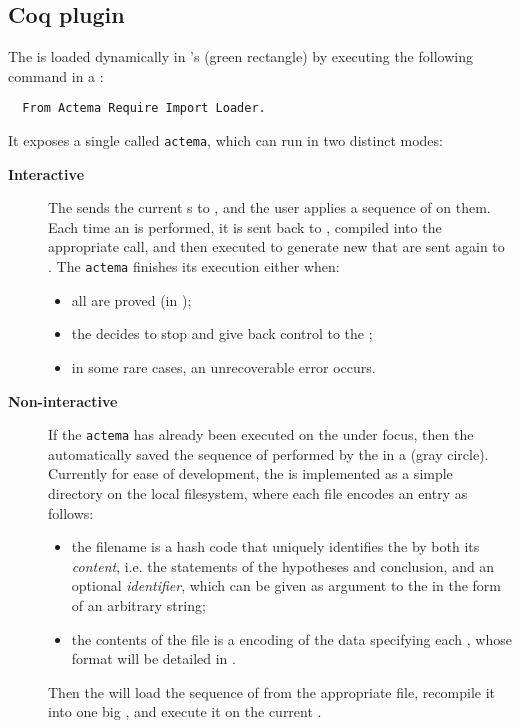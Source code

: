 \subsection{Coq plugin}

The  is loaded dynamically in 's  (green
rectangle) by executing the following command in a :
\begin{verbatim}
  From Actema Require Import Loader.
\end{verbatim}
It exposes a single  called \texttt{actema}, which can run in two
distinct modes:
\begin{description}
  \item[\bfseries Interactive] The  sends the current
  s to , and the user applies a sequence of  on
  them. Each time an  is performed, it is sent back to , compiled
  into the appropriate  call, and then executed to generate new
   that are sent again to . The \texttt{actema}
   finishes its execution either when:
  \begin{itemize}
    \item all  are proved (in );
    \item the  decides to stop and give back control to the
    ;
    \item in some rare cases, an unrecoverable error occurs.
  \end{itemize}

  \item[\bfseries Non-interactive] If the \texttt{actema}  has
  already been executed on the  under focus, then the
   automatically saved the sequence of  performed by the
   in a  (gray circle). Currently for ease of
  development, the  is implemented as a simple directory on
  the local filesystem, where each file encodes an entry as follows:
  \begin{itemize}
    \item the filename is a hash code that uniquely identifies the  by both
    its \emph{content}, i.e. the statements of the hypotheses and conclusion,
    and an optional \emph{identifier}, which can be given as argument to the
     in the form of an arbitrary string;
    \item the contents of the file is a  encoding of
    the data specifying each , whose format will be detailed in
    .
  \end{itemize}
  Then the  will load the sequence of  from the appropriate file,
  recompile it into one big , and execute it on the current .
\end{description}
